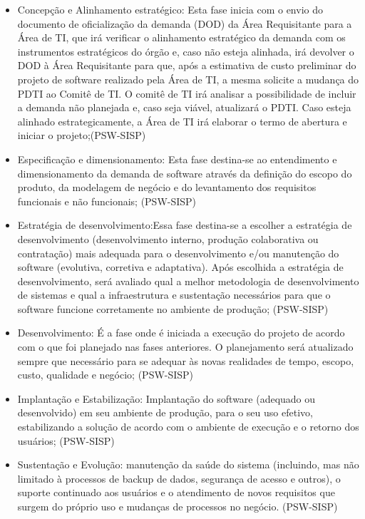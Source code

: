 \begin{itemize}
\item Concepção e Alinhamento estratégico: Esta fase inicia com o envio do 
documento de oficialização da demanda (DOD) da Área Requisitante para a Área de 
TI, que irá verificar o alinhamento estratégico da demanda com os instrumentos 
estratégicos do órgão e, caso não esteja alinhada, irá devolver o DOD à Área 
Requisitante para que, após a estimativa de custo preliminar do projeto de software 
realizado pela Área de TI, a mesma solicite a mudança do PDTI ao Comitê de TI. O 
comitê de TI irá analisar a possibilidade de incluir a demanda não planejada e, 
caso seja viável, atualizará o PDTI. Caso esteja alinhado estrategicamente, a 
Área de TI irá elaborar o termo de abertura e iniciar o projeto;(PSW-SISP)

\item Especificação e dimensionamento: Esta fase destina-se ao entendimento e 
dimensionamento da demanda de software através da definição do escopo do produto, 
da modelagem de negócio e do levantamento dos requisitos funcionais e não funcionais;
(PSW-SISP)

\item Estratégia de desenvolvimento:Essa fase destina-se a escolher a estratégia 
de desenvolvimento (desenvolvimento interno, produção colaborativa ou contratação) 
mais adequada para o desenvolvimento e/ou manutenção do software (evolutiva, 
corretiva e adaptativa). Após escolhida a estratégia de desenvolvimento, será 
avaliado qual a melhor metodologia de desenvolvimento de sistemas e qual a infraestrutura 
e sustentação necessários para que o software funcione corretamente no ambiente de produção; 
(PSW-SISP)

\item Desenvolvimento: É a fase onde é iniciada a execução do projeto de acordo 
com o que foi planejado nas fases anteriores. O planejamento será atualizado 
sempre que necessário para se adequar às novas realidades de tempo, escopo, 
custo, qualidade e negócio; (PSW-SISP)

\item Implantação e Estabilização: Implantação do software (adequado ou desenvolvido) 
em seu ambiente de produção, para o seu uso efetivo, estabilizando a solução de 
acordo com o ambiente de execução e o retorno dos usuários; (PSW-SISP)

\item Sustentação e Evolução: manutenção da saúde do sistema (incluindo, mas não 
limitado à processos de backup de dados, segurança de acesso e outros), o suporte 
continuado aos usuários e o atendimento de novos requisitos que surgem do próprio 
uso e mudanças de processos no negócio. (PSW-SISP)

\end{itemize}

